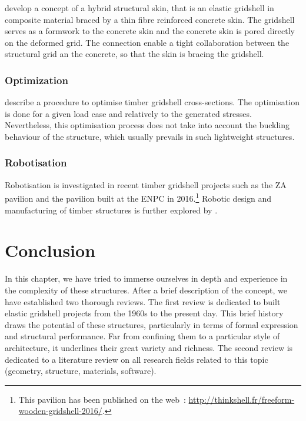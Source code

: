  develop a concept of a hybrid structural skin, that is an elastic gridshell in composite material braced by a thin fibre reinforced concrete skin. The gridshell serves as a formwork to the concrete skin and the concrete skin is pored directly on the deformed grid. The connection enable a tight collaboration between the structural grid an the concrete, so that the skin is bracing the gridshell.

\subsubsection{Optimization}
 describe a procedure to optimise timber gridshell cross-sections. The  optimisation is done for a given load case and relatively to the generated stresses. Nevertheless, this optimisation process does not take into account the buckling behaviour of the structure, which usually prevails in such lightweight structures.

\subsubsection{Robotisation}
Robotisation is investigated in recent timber gridshell projects such as the ZA pavilion \cite{Mork2016} and the pavilion built at the ENPC in 2016.\footnote{This pavilion has been published on the web~: \url{http://thinkshell.fr/freeform-wooden-gridshell-2016/}.} Robotic design and manufacturing of timber structures is further explored by .

\section{Conclusion}

In this chapter, we have tried to immerse ourselves in depth and experience in the complexity of these structures. After a brief description of the concept, we have established two thorough reviews. The first review is dedicated to built elastic gridshell projects from the 1960s to the present day. This brief history draws the potential of these structures, particularly in terms of formal expression and structural performance. Far from confining them to a particular style of architecture, it underlines their great variety and richness. The second review is dedicated to a literature review on all research fields related to this topic (geometry, structure, materials, software).

















